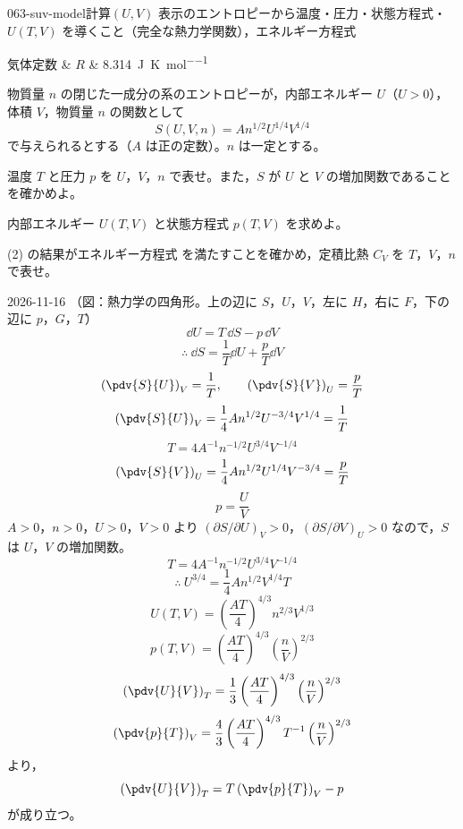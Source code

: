 \documentclass[uplatex,dvipdfmx,a4paper,11pt]{jsarticle}
\begin{document}
\begin{mondai}{063-suv-model}{計算}{$(U,V)$ 表示のエントロピーから温度・圧力・状態方程式・$U(T,V)$ を導くこと（完全な熱力学関数），エネルギー方程式}
\begin{teisuu}
  気体定数 & $R$ & \qty{8.314}{\joule\per\kelvin\per\mole}\\
\end{teisuu}
物質量 $n$ の閉じた一成分の系のエントロピーが，内部エネルギー $U$（$U > 0$），体積 $V$，物質量 $n$ の関数として
  \[ S(U,V,n) = An^{1/2}U^{1/4}V^{1/4} \]
  で与えられるとする（$A$ は正の定数）。$n$ は一定とする。
  \begin{shoumon}
    \item 温度 $T$ と圧力 $p$ を $U$，$V$，$n$ で表せ。また，$S$ が $U$ と $V$ の増加関数であることを確かめよ。
    \item 内部エネルギー $U(T,V)$ と状態方程式 $p(T,V)$ を求めよ。
    \item (2) の結果がエネルギー方程式  を満たすことを確かめ，定積比熱 $C_{V}$ を $T$，$V$，$n$ で表せ。
  \end{shoumon}
\begin{kotaeutsushi}{2026-11-16}
（図：熱力学の四角形。上の辺に $S$，$U$，$V$，左に $H$，右に $F$，下の辺に $p$，$G$，$T$）
\[ \dd U=T\,\dd S-p\,\dd V \]
\[ \therefore\ \dd S=\frac{1}{T}\dd U+\frac{p}{T}\dd V \]
\[ \left(\pdv{S}{U}\right)_{V}=\frac{1}{T},\qquad\left(\pdv{S}{V}\right)_{U}=\frac{p}{T} \]
\[ \left(\pdv{S}{U}\right)_{V}=\frac{1}{4}An^{1/2}U^{-3/4}V^{1/4}=\frac{1}{T} \]
\[ T=4A^{-1}n^{-1/2}U^{3/4}V^{-1/4} \]
\[ \left(\pdv{S}{V}\right)_{U}=\frac{1}{4}An^{1/2}U^{1/4}V^{-3/4}=\frac{p}{T} \]
\[ p=\frac{U}{V} \]
$A>0$，$n>0$，$U>0$，$V>0$ より $(\partial S/\partial U)_{V}>0$，$(\partial S/\partial V)_{U}>0$ なので，$S$ は $U$，$V$ の増加関数。
\[ T=4A^{-1}n^{-1/2}U^{3/4}V^{-1/4} \]
\[ \therefore\ U^{3/4}=\frac{1}{4}An^{1/2}V^{1/4}T \]
\[ U(T,V)=\left(\frac{AT}{4}\right)^{4/3}n^{2/3}V^{1/3} \]
\[ p(T,V)=\left(\frac{AT}{4}\right)^{4/3}\left(\frac{n}{V}\right)^{2/3} \]
\[ \left(\pdv{U}{V}\right)_{T}=\frac{1}{3}\left(\frac{AT}{4}\right)^{4/3}\left(\frac{n}{V}\right)^{2/3} \]
\[ \left(\pdv{p}{T}\right)_{V}=\frac{4}{3}\left(\frac{AT}{4}\right)^{4/3}T^{-1}\left(\frac{n}{V}\right)^{2/3} \]
より，
\[ \left(\pdv{U}{V}\right)_{T}=T\left(\pdv{p}{T}\right)_{V}-p \]
が成り立つ。

\end{kotaeutsushi}
\end{mondai}
\end{document}
